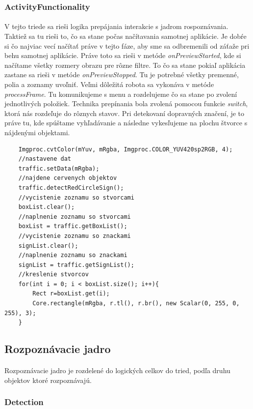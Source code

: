 \documentclass[12pt]{article}
\begin{document}
\subsubsection{ActivityFunctionality}
\paragraph{}
V tejto triede sa rieši logika prepájania interakcie s jadrom rospoznávania. Taktiež sa tu rieši to, čo sa stane počas načítavania samotnej aplikácie.
Je dobŕe si čo najviac vecí načítať práve v tejto fáze, aby sme sa odbremenili od záťaže pri behu samotnej aplikácie. Práve toto sa rieši v metóde \emph{onPreviewStarted}, kde si načítame všetky rozmery obrazu pre rôzne filtre.
To čo sa stane pokiaľ aplikácia zastane sa rieši v metóde \emph{onPreviewStopped}. Tu je potrebné všetky premenné, polia a zoznamy uvoľniť. Veľmi dôležitá robota sa vykonáva v metóde \emph{processFrame}.
Tu komunikujeme s menu a rozdelujeme čo sa stane po zvolení jednotlivých položiek. Technika prepínania bola zvolená pomocou funkcie \emph{switch}, ktorá nás rozdeľuje do rôznych stavov. Pri detekovaní dopravných značení, je to práve tu, kde spúštame vyhľadávanie a následne vykesľujeme na plochu štvorce s nájdenými objektami.
\begin{lstlisting}
	Imgproc.cvtColor(mYuv, mRgba, Imgproc.COLOR_YUV420sp2RGB, 4);
	//nastavene dat
	traffic.setData(mRgba);
	//najdene cervenych objektov
	traffic.detectRedCircleSign();
	//vycistenie zoznamu so stvorcami
	boxList.clear();
	//naplnenie zoznamu so stvorcami
	boxList = traffic.getBoxList();
	//vycistenie zoznamu so znackami
	signList.clear();
	//naplnenie zoznamu so znackami
	signList = traffic.getSignList();
	//kreslenie stvorcov
	for(int i = 0; i < boxList.size(); i++){
		Rect r=boxList.get(i);
		Core.rectangle(mRgba, r.tl(), r.br(), new Scalar(0, 255, 0, 255), 3);
	}
\end{lstlisting}
\subsection{Rozpoznávacie jadro}
\paragraph{}
Rozpoznávacie jadro je rozdelené do logických celkov do tried, podľa druhu objektov ktoré rozpoznávajú.
\subsubsection{Detection}
\end{document}
